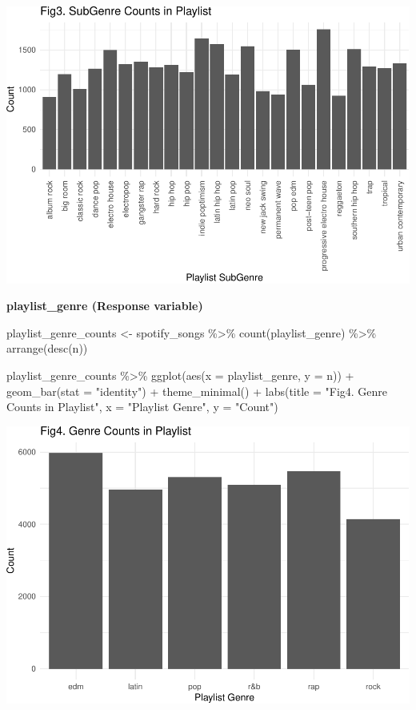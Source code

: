 \documentclass[
]{article}
\newenvironment{Shaded}{\begin{snugshade}}{\end{snugshade}}
\newcommand{\AttributeTok}[1]{\textcolor[rgb]{0.77,0.63,0.00}{#1}}
\newcommand{\FunctionTok}[1]{\textcolor[rgb]{0.00,0.00,0.00}{#1}}
\newcommand{\NormalTok}[1]{#1}
\newcommand{\OtherTok}[1]{\textcolor[rgb]{0.56,0.35,0.01}{#1}}
\newcommand{\SpecialCharTok}[1]{\textcolor[rgb]{0.00,0.00,0.00}{#1}}
\newcommand{\StringTok}[1]{\textcolor[rgb]{0.31,0.60,0.02}{#1}}
\begin{document}
\includegraphics{Final-Report_files/figure-latex/unnamed-chunk-10-1.pdf}

\textbf{playlist\_genre (Response variable)}

\begin{Shaded}
\begin{Highlighting}[]
\NormalTok{playlist\_genre\_counts }\OtherTok{\textless{}{-}}\NormalTok{ spotify\_songs }\SpecialCharTok{\%\textgreater{}\%}
  \FunctionTok{count}\NormalTok{(playlist\_genre) }\SpecialCharTok{\%\textgreater{}\%}
  \FunctionTok{arrange}\NormalTok{(}\FunctionTok{desc}\NormalTok{(n))}

\NormalTok{playlist\_genre\_counts }\SpecialCharTok{\%\textgreater{}\%}
  \FunctionTok{ggplot}\NormalTok{(}\FunctionTok{aes}\NormalTok{(}\AttributeTok{x =}\NormalTok{ playlist\_genre, }\AttributeTok{y =}\NormalTok{ n)) }\SpecialCharTok{+}
  \FunctionTok{geom\_bar}\NormalTok{(}\AttributeTok{stat =} \StringTok{"identity"}\NormalTok{) }\SpecialCharTok{+}
  \FunctionTok{theme\_minimal}\NormalTok{() }\SpecialCharTok{+}
  \FunctionTok{labs}\NormalTok{(}\AttributeTok{title =} \StringTok{"Fig4. Genre Counts in Playlist"}\NormalTok{,}
       \AttributeTok{x =} \StringTok{"Playlist Genre"}\NormalTok{,}
       \AttributeTok{y =} \StringTok{"Count"}\NormalTok{)}
\end{Highlighting}
\end{Shaded}

\includegraphics{Final-Report_files/figure-latex/unnamed-chunk-11-1.pdf}
\end{document}
